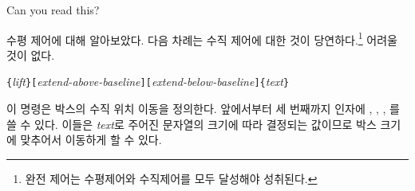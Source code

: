 \begin{example}
\par
{}\par
{} \par
{} \par
{}
Can you read this?
\end{example}

수평 제어에 대해 알아보았다. 다음 차례는 수직 제어에 대한 것이 당연하다.\footnote{%
  완전 제어는 수평제어와 수직제어를 모두 달성해야 성취된다.
}
어려울 것이 없다.

\begin{lscommand}
\verb|{|\emph{lift}\verb|}[|\emph{extend-above-baseline}\verb|][|\emph{extend-below-baseline}\verb|]{|\emph{text}\verb|}|
\end{lscommand}

\noindent 이 명령은 박스의 수직 위치 이동을 정의한다. 
앞에서부터 세 번째까지 인자에 
, , , 를 
쓸 수 있다. 이들은 \emph{text}로 주어진 문자열의 크기에 따라 결정되는 값이므로 박스 크기에 맞추어서 이동하게 할 수 있다.

